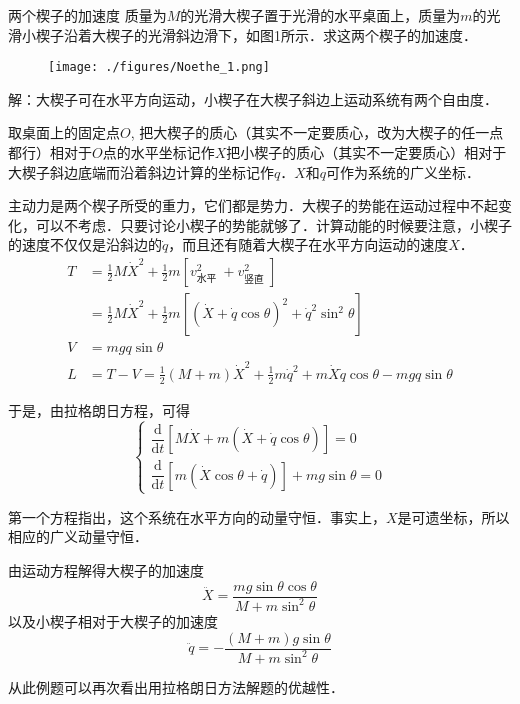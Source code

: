 \begin{example}{两个楔子的加速度}
质量为$M $的光滑大楔子置于光滑的水平桌面上，质量为$m$的光滑小楔子沿着大楔子的光滑斜边滑下，如图1所示．求这两个楔子的加速度．
\begin{figure}[ht]
\centering
\texttt{[image: ./figures/Noethe\_1.png]}
\caption{} \label{Noethe_fig1}
\end{figure}

解：大楔子可在水平方向运动，小楔子在大楔子斜边上运动系统有两个自由度．

取桌面上的固定点$O$, 把大楔子的质心（其实不一定要质心，改为大楔子的任一点都行）相对于$O$点的水平坐标记作$X $把小楔子的质心（其实不一定要质心）相对于大楔子斜边底端而沿着斜边计算的坐标记作$q$．$X $和$q $可作为系统的广义坐标．

主动力是两个楔子所受的重力，它们都是势力．大楔子的势能在运动过程中不起变化，可以不考虑．只要讨论小楔子的势能就够了．计算动能的时候要注意，小楔子的速度不仅仅是沿斜边的$\dot q$，而且还有随着大楔子在水平方向运动的速度$X$．
\begin{equation}
\begin{aligned} T &=\frac{1}{2} M \dot{X}^{2}+\frac{1}{2} m\left[v_{\text {水平 }}^{2}+v_{\text {竖直 }}^{2}\right] \\ &=\frac{1}{2} M \dot{X}^{2}+\frac{1}{2} m\left[(\dot{X}+\dot{q} \cos \theta)^{2}+\dot{q}^{2} \sin ^{2} \theta\right] \\ V &=m g q \sin \theta \\ L &=T-V=\frac{1}{2}(M+m) \dot{X}^{2}+\frac{1}{2} m \dot{q}^{2}+m \dot{X} \dot{q} \cos \theta-m g q \sin \theta \end{aligned}
\end{equation}

于是，由拉格朗日方程，可得
\begin{equation}
\begin{cases}
\dfrac{\mathrm{d}}{\mathrm{d} t}[M \dot{X}+m(\dot{X}+\dot{q} \cos \theta)]=0 \\ \dfrac{\mathrm{d}}{\mathrm{d} t}[m(\dot{X} \cos \theta+\dot{q})]+m g \sin \theta=0
\end{cases}
\end{equation}

第一个方程指出，这个系统在水平方向的动量守恒．事实上，$X$是可遗坐标，所以相应的广义动量守恒．

由运动方程解得大楔子的加速度
\begin{equation}
\ddot{X}=\frac{m g \sin \theta \cos \theta}{M+m \sin ^{2} \theta}
\end{equation}
以及小楔子相对于大楔子的加速度
\begin{equation}
\ddot{q}=-\frac{(M+m) g \sin \theta}{M+m \sin ^{2} \theta}
\end{equation}

\end{example}
从此例题可以再次看出用拉格朗日方法解题的优越性．

